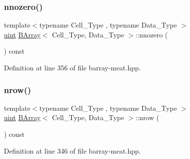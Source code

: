 \mbox{\label{class_b_array_a9910b6f42e37d3b0a12cafb70b78775f}} 
\subsubsection{\texorpdfstring{nnozero()}{nnozero()}}
{\footnotesize\ttfamily template$<$typename Cell\+\_\+\+Type , typename Data\+\_\+\+Type $>$ \\
\hyperlink{typedefs_8hpp_a91ad9478d81a7aaf2593e8d9c3d06a14}{uint} \hyperlink{class_b_array}{B\+Array}$<$ Cell\+\_\+\+Type, Data\+\_\+\+Type $>$\+::nnozero (\begin{DoxyParamCaption}{ }\end{DoxyParamCaption}) const\hspace{0.3cm}{\ttfamily [inline]}}



Definition at line 356 of file barray-\/meat.\+hpp.

\mbox{\label{class_b_array_ac829edf4a9921bd6b3f56afbcbb2f37f}} 
\subsubsection{\texorpdfstring{nrow()}{nrow()}}
{\footnotesize\ttfamily template$<$typename Cell\+\_\+\+Type , typename Data\+\_\+\+Type $>$ \\
\hyperlink{typedefs_8hpp_a91ad9478d81a7aaf2593e8d9c3d06a14}{uint} \hyperlink{class_b_array}{B\+Array}$<$ Cell\+\_\+\+Type, Data\+\_\+\+Type $>$\+::nrow (\begin{DoxyParamCaption}{ }\end{DoxyParamCaption}) const\hspace{0.3cm}{\ttfamily [inline]}}



Definition at line 346 of file barray-\/meat.\+hpp.

\mbox{\label{class_b_array_a8ddd0f172972420dce2cfce014126dba}} 
